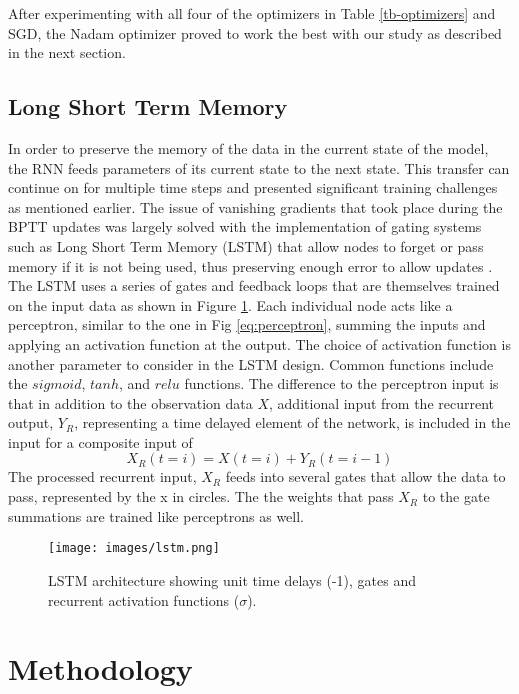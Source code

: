 \documentclass[preprint,12pt,authoryear]{elsarticle}
\begin{document}
	
\begin{linenumbers}
%
After experimenting with all four of the optimizers in Table \ref{tb-optimizers} and SGD, the Nadam optimizer proved to work the best with our study as described in the next section.

\subsection{Long Short Term Memory}

In order to preserve the memory of the data in the current state of the model, the RNN feeds parameters of its current state to the next state. This transfer can continue on for multiple time steps and presented significant training challenges as mentioned earlier. The issue of vanishing gradients that took place during the BPTT updates was largely solved with the implementation of gating systems such as Long Short Term Memory (LSTM) that allow nodes to forget or pass memory if it is not being used, thus preserving enough error to allow updates \citep{Hochreiter1997}. The LSTM uses a series of gates and feedback loops that are themselves trained on the input data as shown in Figure \ref{fig:lstm}. Each individual node acts like a perceptron, similar to the one in Fig \ref{eq:perceptron}, summing the inputs and applying an activation function at the output. The choice of activation function is another parameter to consider in the LSTM design. Common functions include the $sigmoid$, $tanh$, and $relu$ functions. The difference to the perceptron input is that in addition to the observation data $X$, additional input from the recurrent output, $Y_{R}$, representing a time delayed element of the network, is included in the input for a composite input of 
%
\begin{equation}
\label{eq:Xr}
X_{R}(t=i) = X(t=i) + Y_{R}(t=i-1)
\end{equation}
%
The processed recurrent input, $X_{R}$ feeds into several gates that allow the data to pass, represented by the x in circles. The the weights that pass $X_{R}$ to the gate summations are trained like perceptrons as well.
%
\begin{figure}[H]
\centering
\texttt{[image: images/lstm.png]} 
\caption{LSTM architecture showing unit time delays (-1), gates and recurrent activation functions ($\sigma$).}
\label{fig:lstm}
\end{figure}
%

\section{Methodology}


\end{linenumbers}
\end{document}

